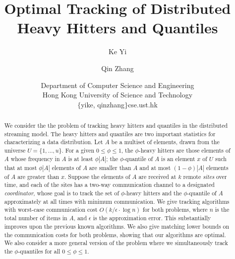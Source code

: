 \documentclass[10pt]{article}
\title{Optimal Tracking of Distributed Heavy Hitters and Quantiles}
\author{Ke Yi \and Qin Zhang}
\date{Department of Computer Science and Engineering \\
Hong Kong University of Science and Technology \\
$\{$yike, qinzhang$\}$cse.ust.hk}
\newcommand{\eps}{\epsilon}
\begin{document}
\maketitle

\begin{abstract}
  We consider the the problem of tracking heavy hitters and quantiles in
  the distributed streaming model.  The heavy hitters and quantiles are two
  important statistics for characterizing a data distribution.  Let $A$ be
  a multiset of elements, drawn from the universe $U=\{1,\dots,u\}$.  For a
  given $0 \le \phi \le 1$, the $\phi$-heavy hitters are those elements of
  $A$ whose frequency in $A$ is at least $\phi |A|$; the $\phi$-quantile of
  $A$ is an element $x$ of $U$ such that at most $\phi|A|$ elements of $A$
  are smaller than $A$ and at most $(1-\phi)|A|$ elements of $A$ are
  greater than $x$.  Suppose the elements of $A$ are received at $k$ remote
  {\em sites} over time, and each of the sites has a two-way communication
  channel to a designated {\em coordinator}, whose goal is to track the set
  of $\phi$-heavy hitters and the $\phi$-quantile of $A$ approximately at
  all times with minimum communication.  We give tracking algorithms with
  worst-case communication cost $O(k/\eps \cdot \log n)$ for both problems,
  where $n$ is the total number of items in $A$, and $\eps$ is the
  approximation error.  This substantially improves upon the previous known
  algorithms.  We also give matching lower bounds on the communication
  costs for both problems, showing that our algorithms are optimal.  We
  also consider a more general version of the problem where we
  simultaneously track the $\phi$-quantiles for all $0 \le \phi \le 1$.
\end{abstract}
\end{document}
